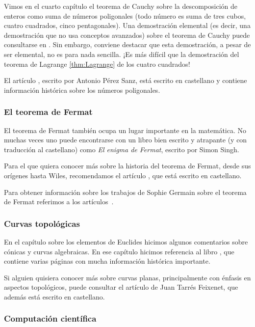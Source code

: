 Vimos en el cuarto capítulo el teorema de Cauchy 
sobre la descomposición de enteros como suma de números poligonales (todo número
es suma de tres cubos, cuatro cuadrados, cinco pentagonales). Una demostración
elemental (es decir, una demostración que no usa conceptos avanzados) 
sobre el teorema de Cauchy puede consultarse en \cite{MR866422}. Sin embargo,
conviene destacar que esta demostración, a pesar de ser elemental, no es
para nada sencilla. ¡Es más difícil que la demostración 
del teorema de Lagrange \ref{thm:Lagrange} de los cuatro cuadrados!

El artículo \cite{zbMATH06696438}, escrito por 
Antonio P{\'e}rez Sanz, está escrito en castellano y contiene información
histórica sobre los números poligonales. 

\subsubsection*{El teorema de Fermat}

El teorema de Fermat también ocupa un lugar importante en 
la matemática. No muchas veces uno puede encontrarse
con un libro bien escrito y atrapante (y con traducción al castellano) 
como \emph{El enigma de Fermat}, escrito por Simon Singh. 

Para
el que quiera conocer más sobre la historia del teorema
de Fermat, desde sus orígenes hasta Wiles, 
recomendamos el artículo \cite{corry_fermat}, que está escrito en castellano.  

Para obtener información sobre
los trabajos de Sophie Germain sobre el teorema de Fermat referimos a los
artículos~\cite{MR2415091,MR2735899}.

\subsubsection*{Curvas topológicas}

En el capítulo sobre los elementos de Euclides hicimos algunos
comentarios sobre cónicas y curvas algebraicas. En ese capítulo 
hicimos referencia al libro \cite{MR2975988}, que contiene
varias páginas con mucha información histórica importante. 

Si alguien 
quisiera conocer más sobre curvas planas, principalmente con énfasis 
en aspectos topológicos, 
puede consultar el artículo \cite{tf_curvas} de Juan Tarrés Feixenet, 
que además está escrito en castellano. 

\subsubsection*{Computación científica}

